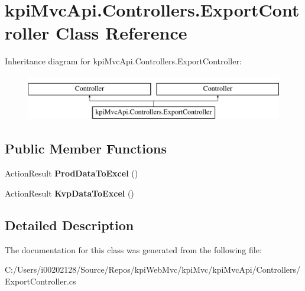 \hypertarget{classkpi_mvc_api_1_1_controllers_1_1_export_controller}{}\section{kpi\+Mvc\+Api.\+Controllers.\+Export\+Controller Class Reference}
\label{classkpi_mvc_api_1_1_controllers_1_1_export_controller}


 


Inheritance diagram for kpi\+Mvc\+Api.\+Controllers.\+Export\+Controller\+:\begin{figure}[H]
\begin{center}
\leavevmode
\includegraphics[height=2.000000cm]{classkpi_mvc_api_1_1_controllers_1_1_export_controller}
\end{center}
\end{figure}
\subsection*{Public Member Functions}
\begin{DoxyCompactItemize}
\item 
\mbox{\label{classkpi_mvc_api_1_1_controllers_1_1_export_controller_a7f779c9cca92a11fd9c37bfef15c0ad4}} 
Action\+Result {\bfseries Prod\+Data\+To\+Excel} ()
\item 
\mbox{\label{classkpi_mvc_api_1_1_controllers_1_1_export_controller_a5350dfcc0605aeb646490cdedd3374bc}} 
Action\+Result {\bfseries Kvp\+Data\+To\+Excel} ()
\end{DoxyCompactItemize}


\subsection{Detailed Description}




The documentation for this class was generated from the following file\+:\begin{DoxyCompactItemize}
\item 
C\+:/\+Users/i00202128/\+Source/\+Repos/kpi\+Web\+Mvc/kpi\+Mvc/kpi\+Mvc\+Api/\+Controllers/Export\+Controller.\+cs\end{DoxyCompactItemize}
